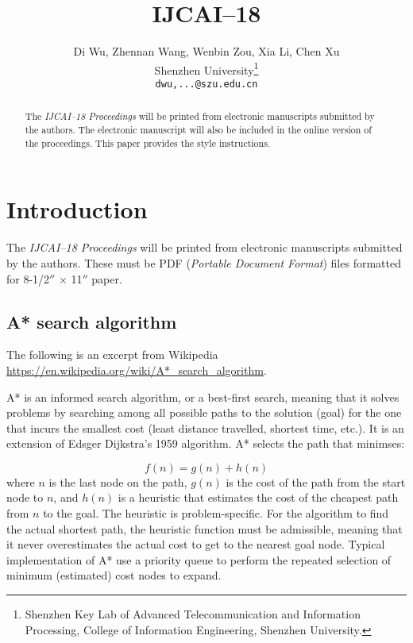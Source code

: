 \documentclass{article}
\title{IJCAI--18}
\author{Di Wu, Zhennan Wang, Wenbin Zou, Xia Li, Chen Xu\\
Shenzhen University\thanks{Shenzhen Key Lab of Advanced Telecommunication and Information Processing, College of Information Engineering, Shenzhen University.}\\
{\tt\small dwu,...@szu.edu.cn}}
\begin{document}
\maketitle

\begin{abstract}
  The {\it IJCAI--18 Proceedings} will be printed from electronic
  manuscripts submitted by the authors. The electronic manuscript will
  also be included in the online version of the proceedings. This paper
  provides the style instructions.
\end{abstract}

\section{Introduction}

The {\it IJCAI--18 Proceedings} will be printed from electronic
manuscripts submitted by the authors. These must be PDF ({\em Portable
Document Format}) files formatted for 8-1/2$''$ $\times$ 11$''$ paper.



\subsection{A* search algorithm}

The following is an excerpt from Wikipedia \url{https://en.wikipedia.org/wiki/A*_search_algorithm}.

A* is an informed search algorithm, or a best-first search, meaning that it solves problems by searching among all possible paths to the solution (goal) for the one that incurs the smallest cost (least distance travelled, shortest time, etc.). It is an extension of Edsger Dijkstra's 1959 algorithm. A* selects the path that minimses:

\begin{equation}
f(n) = g(n) + h(n)
\end{equation}
where $n$ is the last node on the path, $g(n)$ is the cost of the path from the start node to $n$, and $h(n)$ is a heuristic that estimates the cost of the cheapest path from $n$ to the goal.
The heuristic is problem-specific. For the algorithm to find the actual shortest path, the heuristic function must be admissible, meaning that it never overestimates the actual cost to get to the nearest goal node.
Typical implementation of A* use a priority queue to perform the repeated selection of minimum (estimated) cost nodes to expand.
\end{document}

